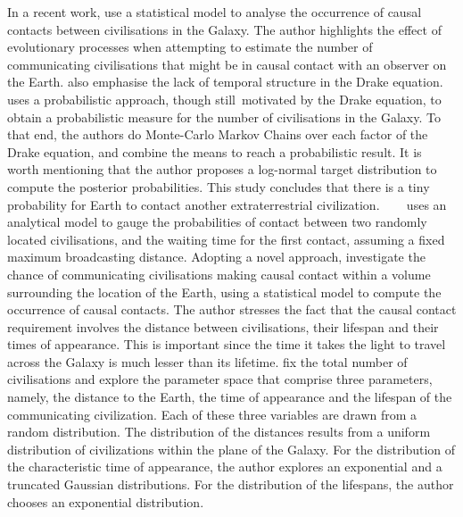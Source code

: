 \documentclass[crop]{CSLB}
\begin{document}
In a recent work, \citep{balbi_impact_2018} use a statistical model to analyse the occurrence of causal contacts between civilisations in the Galaxy.
%
The author highlights the effect of evolutionary processes when attempting to estimate the number of communicating civilisations that might be in causal contact with an observer on the Earth.
%
\citet{cirkovic_temporal_2004} also emphasise the lack of temporal structure in the Drake equation.
%
\citet{bloetscher_using_2019} uses a probabilistic approach, though still motivated by the Drake equation, to obtain a probabilistic measure for the number of civilisations in the Galaxy.
%
To that end, the authors do Monte-Carlo Markov Chains over each factor of the Drake equation, and combine the means to reach a probabilistic result.
%
It is worth mentioning that the author proposes a log-normal target distribution to compute the posterior probabilities.
%
This study concludes that there is a tiny probability for Earth to contact another extraterrestrial civilization.    
%
\citet{smith_broadcasting_2009} uses an analytical model to gauge the probabilities of contact between two randomly located civilisations, and the waiting time for the first contact, assuming a fixed maximum broadcasting distance.
% 
Adopting a novel approach, \citet{balbi_impact_2018} investigate the chance of communicating civilisations making causal contact within a volume surrounding the location of the Earth, using a statistical model to compute the occurrence of causal contacts.
%
The author stresses the fact that the causal contact requirement involves the distance between civilisations, their lifespan and their times of appearance. This is important since the time it takes the light to travel across the Galaxy is much lesser than its lifetime.
%
\citet{balbi_impact_2018} fix the total number of civilisations and explore the parameter space that comprise three parameters, namely, the distance to the Earth, the time of appearance and the lifespan of the communicating civilization.
%
Each of these three variables are drawn from a random distribution. The distribution of the distances results from a uniform distribution of civilizations within the plane of the Galaxy.
%
For the distribution of the characteristic time of appearance, the author explores an exponential and a truncated Gaussian distributions. For the distribution of the lifespans, the author chooses an exponential distribution.



\end{document}
